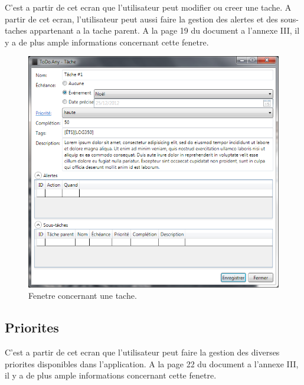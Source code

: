 \documentclass[letterpaper, oneside, 12pt, these, creativecommons]{thETS}
\begin{document}
C'est a partir de cet ecran que l'utilisateur peut modifier ou creer une tache. A partir de cet ecran, l'utilisateur peut aussi faire la gestion des alertes et des sous-taches appartenant a la tache parent. A la page 19 du document a l'annexe III, il y a de plus ample informations concernant cette fenetre.

\begin{figure}[H!]
	\centering
	\includegraphics[width=1\textwidth]{fenetre_tache.png}
	\caption{Fenetre concernant une tache.}
\end{figure}

\newpage

\subsection{Priorites}

C'est a partir de cet ecran que l'utilisateur peut faire la gestion des diverses priorites disponibles dans l'application. A la page 22 du document a l'annexe III, il y a de plus ample informations concernant cette fenetre.
\end{document}
